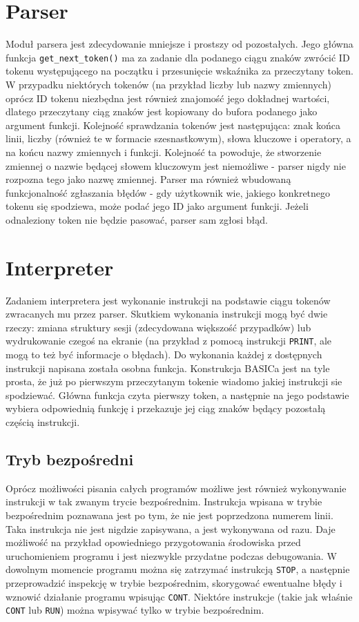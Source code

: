 \documentclass[shortabstract]{iithesis}
\begin{document}
\section{Parser}
  Moduł parsera jest zdecydowanie mniejsze i prostszy od pozostałych. Jego główna funkcja \texttt{get\_next\_token()} ma za zadanie dla podanego ciągu znaków zwrócić ID tokenu występującego na początku i przesunięcie wskaźnika za przeczytany token. W przypadku niektórych tokenów (na przykład liczby lub nazwy zmiennych) oprócz ID  tokenu niezbędna jest również znajomość jego dokładnej wartości, dlatego przeczytany ciąg znaków jest kopiowany do bufora podanego jako argument funkcji. Kolejność sprawdzania tokenów jest następująca: znak końca linii, liczby (również te w formacie szesnastkowym), słowa kluczowe i operatory, a na końcu nazwy zmiennych i funkcji. Kolejność ta powoduje, że stworzenie zmiennej o nazwie będącej słowem kluczowym jest niemożliwe - parser nigdy nie rozpozna tego jako nazwę zmiennej. Parser ma również wbudowaną funkcjonalność zgłaszania błędów - gdy użytkownik wie, jakiego konkretnego tokenu się spodziewa, może podać jego ID jako argument funkcji. Jeżeli odnaleziony token nie będzie pasować, parser sam zgłosi błąd.

\section{Interpreter}
  Zadaniem interpretera jest wykonanie instrukcji na podstawie ciągu tokenów zwracanych mu przez parser. Skutkiem wykonania instrukcji mogą być dwie rzeczy: zmiana struktury sesji (zdecydowana większość przypadków) lub wydrukowanie czegoś na ekranie (na przykład z pomocą instrukcji \texttt{PRINT}, ale mogą to też być informacje o błędach). Do wykonania każdej z dostępnych instrukcji napisana została osobna funkcja. Konstrukcja BASICa jest na tyle prosta, że już po pierwszym przeczytanym tokenie wiadomo jakiej instrukcji sie spodziewać. Główna funkcja czyta pierwszy token, a następnie na jego podstawie wybiera odpowiednią funkcję i przekazuje jej ciąg znaków będący pozostałą częścią instrukcji.
\subsection{Tryb bezpośredni}
Oprócz możliwości pisania całych programów możliwe jest również wykonywanie instrukcji w tak zwanym trycie bezpośrednim. Instrukcja wpisana w trybie bezpośrednim poznawana jest po tym, że nie jest poprzedzona numerem linii. Taka instrukcja nie jest nigdzie zapisywana, a jest wykonywana od razu. Daje możliwość na przykład opowiedniego przygotowania środowiska przed uruchomieniem programu i jest niezwykle przydatne podczas debugowania. W dowolnym momencie programu można się zatrzymać instrukcją \texttt{STOP}, a następnie przeprowadzić inspekcję w trybie bezpośrednim, skorygować ewentualne błędy i wznowić działanie programu wpisując \texttt{CONT}. Niektóre instrukcje (takie jak właśnie \texttt{CONT} lub \texttt{RUN}) można wpisywać tylko w trybie bezpośrednim.
\end{document}
